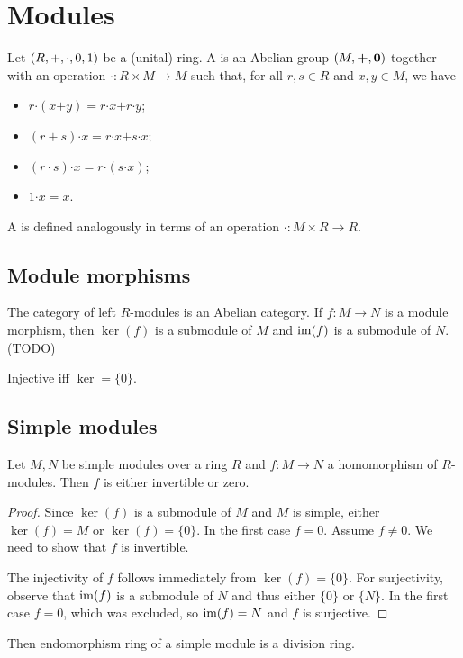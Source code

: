\section{Modules}
\begin{definition}
Let $\sSet{R, +, \cdot, 0,1}$ be a (unital) ring. A  is an Abelian group $\sSet{M, \boldsymbol{+}, \vec{0}}$ together with an operation $\boldsymbol{\cdot}: R\times M \to M$ such that, for all $r,s\in R$ and $x,y \in M$, we have
\begin{itemize}
\item $r \boldsymbol{\cdot} (x\boldsymbol{+}y) = r\boldsymbol{\cdot}x \boldsymbol{+} r\boldsymbol{\cdot} y$;
\item $(r+s)\boldsymbol{\cdot} x = r\boldsymbol{\cdot}x \boldsymbol{+} s\boldsymbol{\cdot} x$;
\item $(r\cdot s)\boldsymbol{\cdot}x = r\boldsymbol{\cdot}(s\boldsymbol{\cdot}x)$;
\item $1\boldsymbol{\cdot}x = x$.
\end{itemize}
A  is defined analogously in terms of an operation $\boldsymbol{\cdot}: M\times R \to R$.
\end{definition}

\subsection{Module morphisms}
The category of left $R$-modules is an Abelian category. If $f: M\to N$ is a module morphism, then $\ker(f)$ is a submodule of $M$ and $\operatorname{im}(f)$ is a submodule of $N$. (TODO)

\begin{lemma}
Injective iff $\ker = \{0\}$. 
\end{lemma}

\subsection{Simple modules}

\begin{theorem} \label{SchursLemma}
Let $M,N$ be simple modules over a ring $R$ and $f:M\to N$ a homomorphism of $R$-modules. Then $f$ is either invertible or zero.
\end{theorem}
\begin{proof}
Since $\ker(f)$ is a submodule of $M$ and $M$ is simple, either $\ker(f) = M$ or $\ker(f) = \{0\}$. In the first case $f = 0$. Assume $f\neq 0$. We need to show that $f$ is invertible.

The injectivity of $f$ follows immediately from $\ker(f) = \{0\}$. For surjectivity, observe that $\operatorname{im}(f)$ is a submodule of $N$ and thus either $\{0\}$ or $\{N\}$. In the first case $f = 0$, which was excluded, so $\operatorname{im}(f) = N$ and $f$ is surjective.
\end{proof}
\begin{corollary}
Then endomorphism ring of a simple module is a division ring.
\end{corollary}

